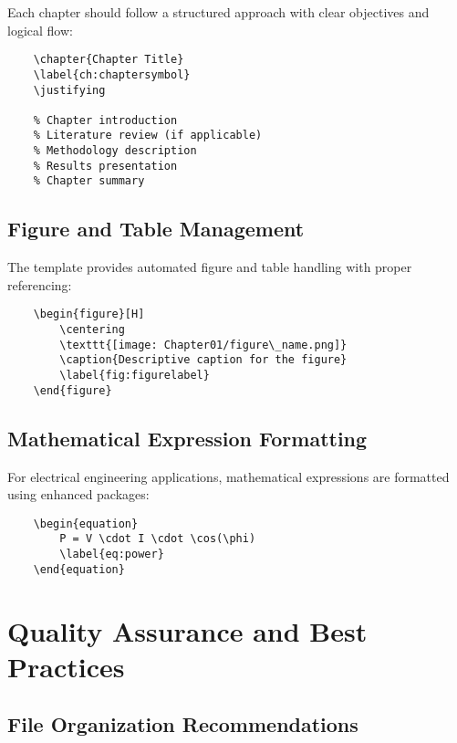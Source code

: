 Each chapter should follow a structured approach with clear objectives and logical flow:

\begin{verbatim}
	\chapter{Chapter Title}
	\label{ch:chaptersymbol}
	\justifying
	
	% Chapter introduction
	% Literature review (if applicable)
	% Methodology description
	% Results presentation
	% Chapter summary
\end{verbatim}

\subsection{Figure and Table Management}
\label{subsec:figure_table}

The template provides automated figure and table handling with proper referencing:

\begin{verbatim}
	\begin{figure}[H]
		\centering
		\texttt{[image: Chapter01/figure\_name.png]}
		\caption{Descriptive caption for the figure}
		\label{fig:figurelabel}
	\end{figure}
\end{verbatim}

\subsection{Mathematical Expression Formatting}
\label{subsec:math_formatting}

For electrical engineering applications, mathematical expressions are formatted using enhanced packages:

\begin{verbatim}
	\begin{equation}
		P = V \cdot I \cdot \cos(\phi)
		\label{eq:power}
	\end{equation}
\end{verbatim}

\section{Quality Assurance and Best Practices}
\label{sec:quality_assurance}

\subsection{File Organization Recommendations}
\label{subsec:file_organization}

